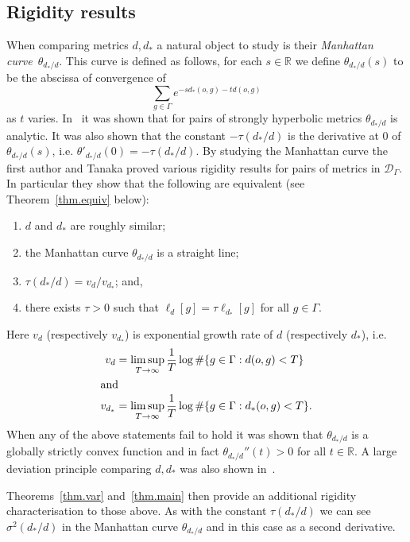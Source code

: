 \documentclass[10pt]{amsart}
\theoremstyle{definition}\newtheorem{defi}[theo]{Definition}\newtheorem{rema}[theo]{Remark}\newtheorem{exam}[theo]{Example}\newtheorem{exem}[theo]{Example}\newtheorem{nota}[theo]{Notation}
\newcommand{\G}{\Gamma}
\newcommand{\Dc}{\mathcal{D}}
\newcommand{\R}{\mathbb{R}}
\let\originalleft\left
\let\originalright\right
\renewcommand{\left}{\mathopen{}\mathclose\bgroup\originalleft}
\renewcommand{\right}{\aftergroup\egroup\originalright}
\renewcommand*{\to}{\mathchoice{\longrightarrow}{\rightarrow}{\rightarrow}{\rightarrow}}
\newcounter{setofcase}
\newcounter{case}[setofcase]
\theoremstyle{plain}
\begin{document}
\subsection{Rigidity results}\label{sec.rigid}
When comparing metrics $d,d_\ast$ a natural object to study is their \emph{Manhattan curve}~$\theta_{d_\ast/d}$. This curve is defined as follows, for each $s \in \R$ we define $\theta_{d_\ast/d}(s)$ to be the abscissa of convergence of
\[
\sum_{g\in\G} e^{-sd_\ast(o,g) - td(o,g)}
\]
as $t$ varies. In~\cite{cantrell.tanaka.2} it was shown that for pairs of strongly hyperbolic metrics $\theta_{d_\ast/d}$ is analytic. It was also shown that the constant $- \tau(d_\ast/d)$ is the derivative at $0$ of $\theta_{d_\ast/d}(s)$, i.e. $\theta'_{d_\ast/d}(0) = - \tau(d_\ast/d)$. By studying the {Manhattan curve} the first author and Tanaka proved various rigidity results for pairs of metrics in $\Dc_\G$. In particular they show that the following are equivalent (see Theorem~\ref{thm.equiv} below):
\begin{enumerate}
\item $d$ and $d_\ast$ are roughly similar;
\item the {Manhattan curve} $\theta_{d_\ast/d}$ is a straight line;
\item $\tau(d_\ast/d) = v_d/v_{d_\ast}$; and,
\item there exists $\tau > 0$ such that $\ell_d[g] = \tau \ell_{d_\ast}[g]$ for all $g\in \G$.
\end{enumerate}
Here $v_d$ (respectively $v_{d_\ast}$) is exponential growth rate of $d$ (respectively $d_\ast$), i.e.
\begin{align*}
v_d &= \limsup_{T\to\infty} \frac{1}{T} \log \#\left\{ g \in \G: d(o,g) < T\right\} \\
\intertext{and} 
v_{d_\ast} &= \limsup_{T\to\infty} \frac{1}{T} \log \#\left\{ g \in \G: d_\ast(o,g) < T\right\}.
\end{align*}
When any of the above statements fail to hold it was shown that $\theta_{d_\ast/d}$ is a globally strictly convex function and in fact $\theta_{d_\ast/d}'' (t) > 0$ for all $t \in \R$. A large deviation principle comparing $d,d_\ast$ was also shown in~\cite{cantrell.tanaka.1}.

Theorems~\ref{thm.var} and~\ref{thm.main} then provide an additional rigidity characterisation to those above. As with the constant $\tau(d_\ast/d)$ we can see $\sigma^2(d_\ast/d)$ in the Manhattan curve $\theta_{d_\ast/d}$ and in this case as a second derivative.
\end{document}
